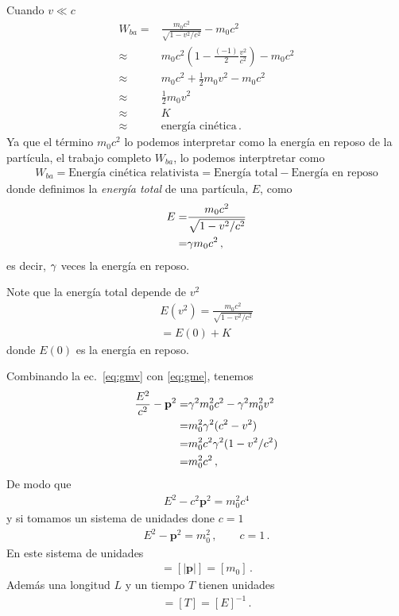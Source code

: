 \begin{frame}
Cuando $v\ll c$
\begin{align*}
 W_{ba} =&\frac{m_0c^2}{\sqrt{1-v^2/c^2}}-m_0 c^2\nonumber\\
\approx&{m_0c^2}\left(1-\frac{(-1)}{2}\frac{v^2}{c^2}\right)-m_0 c^2\nonumber\\
\approx&{m_0c^2}+\frac{1}{2}m_0{v^2}-m_0 c^2\nonumber\\
\approx&\frac{1}{2}m_0{v^2}\nonumber\\
\approx&K\nonumber\\
\approx&\text{energía cinética}\,.
\end{align*}
Ya que el término $m_0c^2$ lo podemos interpretar como la energía en reposo de la partícula, el trabajo completo $W_{ba}$, lo  podemos interptretar como
\begin{align*}
  W_{ba}=\text{Energía cinética relativista}=\text{Energía total}-\text{Energía en reposo}
\end{align*}
donde definimos la \emph{energía total} de una partícula, $E$, como
\begin{align}
  \label{eq:gme}  
  E=&\frac{m_0c^2}{\sqrt{1-v^2/c^2}}\nonumber\\
  =&\gamma m_0c^2\,,
\end{align}
es decir, $\gamma$ veces la energía en reposo.

Note que la energía total depende de $v^2$
\begin{align}
  E(v^2)=\frac{m_0c^2}{\sqrt{1-v^2/c^2}}\nonumber\\
  =E(0)+K
\end{align}
donde $E(0)$ es la energía en reposo.

Combinando la ec.~\eqref{eq:gmv} con \eqref{eq:gme}, tenemos
\begin{align}
  \frac{E^2}{c^2}-\mathbf{p}^2=&\gamma^2 m_0^2 c^2-\gamma^2 m_0^2 v^2\nonumber\\
  =&m_0^2 \gamma^2(  c^2- v^2)\nonumber\\
  =&m_0^2 c^2 \gamma^2( 1- v^2/c^2)\nonumber\\
  =&m_0^2 c^2\,,
\end{align}
De modo que
\begin{align}
  E^2-c^2\mathbf{p}^2=m_0^2 c^4
\end{align}
y si tomamos un sistema de unidades done $c=1$
\begin{align}
  E^2-\mathbf{p}^2=m_0^2\,,\qquad c=1\,.
\end{align}
En este sistema de unidades
\begin{align}
  [E]=[|\mathbf{p}|]=[m_0]\,.
\end{align}
Además una longitud $L$ y un tiempo $T$ tienen unidades
\begin{align}
  [L]=[T]=[E]^{-1}\,.
\end{align}


\end{frame}

